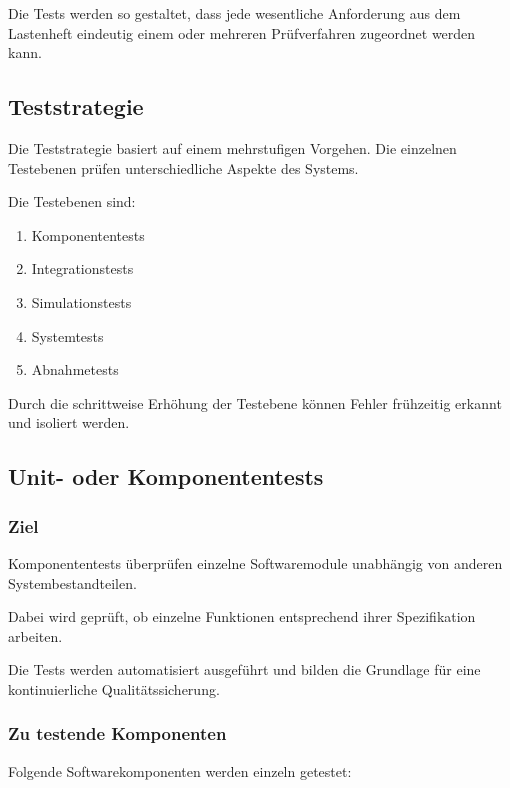 \documentclass[
  a4paper,
  12pt,
  DIV=12,        %
  parskip=half,  %
  headings=small %
]{scrartcl}
\theoremstyle{definition}
\providecommand{\tightlist}{%
  \setlength{\itemsep}{0pt}\setlength{\parskip}{0pt}}
\theoremstyle{definition}
\begin{document}
Die Tests werden so gestaltet, dass jede wesentliche Anforderung aus dem
Lastenheft eindeutig einem oder mehreren Prüfverfahren zugeordnet werden
kann.

\subsection{Teststrategie}\label{teststrategie}

Die Teststrategie basiert auf einem mehrstufigen Vorgehen. Die einzelnen
Testebenen prüfen unterschiedliche Aspekte des Systems.

Die Testebenen sind:

\begin{enumerate}
\def\labelenumi{\arabic{enumi}.}
\tightlist
\item
  Komponententests
\item
  Integrationstests
\item
  Simulationstests
\item
  Systemtests
\item
  Abnahmetests
\end{enumerate}

Durch die schrittweise Erhöhung der Testebene können Fehler frühzeitig
erkannt und isoliert werden.

\subsection{Unit- oder
Komponententests}\label{unit--oder-komponententests}

\subsubsection{Ziel}\label{ziel}

Komponententests überprüfen einzelne Softwaremodule unabhängig von
anderen Systembestandteilen.

Dabei wird geprüft, ob einzelne Funktionen entsprechend ihrer
Spezifikation arbeiten.

Die Tests werden automatisiert ausgeführt und bilden die Grundlage für
eine kontinuierliche Qualitätssicherung.

\subsubsection{Zu testende Komponenten}\label{zu-testende-komponenten}

Folgende Softwarekomponenten werden einzeln getestet:
\end{document}
